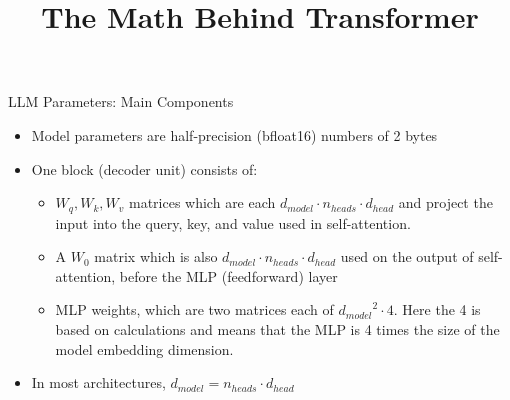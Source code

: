 



\def\myblue#1{\textcolor{texblue}{#1}}

\def\qmark{\myblue{?!?}}

\newcommand{\learninggoals}{
\item Learn to calculate Transformer number of parameters
\item Understand Transformer computation and memory load
\item Learn about Flash Attentions
\item Understand Scaling Laws and Chinchilla
}
\def\myblue#1{\textcolor{texblue}{#1}}

\title{The Math Behind Transformer}
\date{}







\begin{vbframe}{LLM Parameters: Main Components}

\vfill


\begin{itemize}
    \item Model parameters are half-precision (bfloat16) numbers of 2 bytes
    \item One block (decoder unit) consists of:
		\begin{itemize}
		\item $W_q, W_k, W_v$ matrices which are each $d_{model} \cdot n_{heads} \cdot d_{head}$ and project the input into the query, key, and value used in self-attention. 
		\item A $W_0$ matrix which is also $d_{model} \cdot n_{heads} \cdot d_{head}$ used on the output of self-attention, before the MLP (feedforward) layer
		\item MLP weights, which are two matrices each of ${d_{model}}^2 \cdot 4$. Here the 4 is based on calculations and means that the MLP is 4 times the size of the model embedding dimension. 
		\end{itemize}
	\item In most architectures, $d_{model} = n_{heads} \cdot d_{head}$
\end{itemize}

\vfill

\end{vbframe}

